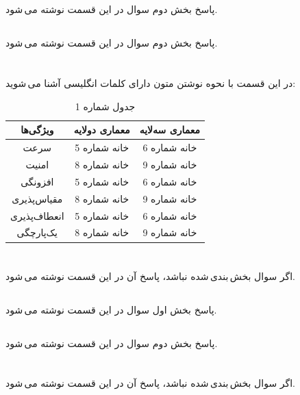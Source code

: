 \documentclass{article}
\begin{document}
\subsection{}
پاسخ بخش دوم سوال در این قسمت نوشته می\,شود.
\subsection{}
پاسخ بخش دوم سوال در این قسمت نوشته می\,شود.

\section{}
در این قسمت با نحوه نوشتن متون دارای کلمات انگلیسی آشنا می\,شوید:\\
\begin{table}[ht]
    \centering
    \begin{tabular}{|c|c|c|}
    \hline
    ویژگی‌ها & معماری دولایه & معماری سه‌لایه\\
    \hline
    سرعت & خانه شماره 5 & خانه شماره 6\\
    \hline
    امنیت & خانه شماره 8 & خانه شماره 9\\
    \hline
    افزونگی & خانه شماره 5 & خانه شماره 6\\
    \hline
    مقیاس‌پذیری & خانه شماره 8 & خانه شماره 9\\
    \hline
    انعطاف‌پذیری & خانه شماره 5 & خانه شماره 6\\
    \hline
    یک‌پارچگی & خانه شماره 8 & خانه شماره 9\\
    \hline
    \end{tabular}
    \caption{جدول شماره 1}
    \label{tab:tab1}
\end{table}

\section{}
اگر سوال بخش\,بندی\,شده نباشد، پاسخ آن در این قسمت نوشته می\,شود.
\subsection{}
پاسخ بخش اول سوال در این قسمت نوشته می\,شود.
\subsection{}
پاسخ بخش دوم سوال در این قسمت نوشته می\,شود.

\section{}
اگر سوال بخش\,بندی\,شده نباشد، پاسخ آن در این قسمت نوشته می\,شود.
\end{document}
